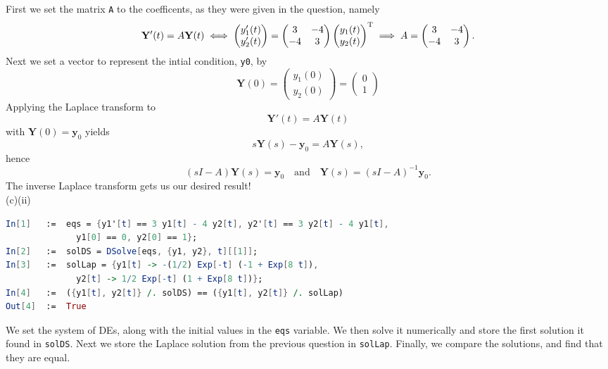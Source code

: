 \documentclass[a4paper,11pt]{report}
\begin{document}
First we set the matrix \texttt{A} to the coefficents, as they were given in the question, namely
$$
  \mathbf{Y}'(t) = A\mathbf{Y}(t) \iff \begin{pmatrix} y_1'(t) \\ y_2'(t) \end{pmatrix} = \begin{pmatrix} 3 & -4 \\ -4 & 3 \end{pmatrix} \begin{pmatrix} y_1(t) \\ y_2(t) \end{pmatrix}^{\mathrm{T}} \implies A = \begin{pmatrix} 3 & -4 \\ -4 & 3 \end{pmatrix}.
$$
Next we set a vector to represent the intial condition, \texttt{y0}, by
$$
  \textbf{Y}(0) = \begin{pmatrix} y_1 (0) \\ y_2(0) \end{pmatrix} = \begin{pmatrix} 0 \\ 1 \end{pmatrix}
$$
Applying the Laplace transform to
$$ 
  \mathbf Y'(t)=A\mathbf Y(t)
$$
with $\mathbf Y(0)=\mathbf y_0$ yields
$$
  s\mathbf Y(s)-\mathbf y_0=A\mathbf Y(s),
$$
hence
$$
  (sI-A)\mathbf{Y}(s)=\mathbf y_0\quad \text{and}\quad \mathbf{Y}(s)=(sI-A)^{-1}\mathbf y_0.
$$
The inverse Laplace transform gets us our desired result! \\

\sol (c)(ii)
\begin{lstlisting}[language=Mathematica]
In[1]   :=  eqs = {y1'[t] == 3 y1[t] - 4 y2[t], y2'[t] == 3 y2[t] - 4 y1[t], 
              y1[0] == 0, y2[0] == 1};             
In[2]   :=  solDS = DSolve[eqs, {y1, y2}, t][[1]];
In[3]   :=  solLap = {y1[t] -> -(1/2) Exp[-t] (-1 + Exp[8 t]),
              y2[t] -> 1/2 Exp[-t] (1 + Exp[8 t])};
In[4]   :=  ({y1[t], y2[t]} /. solDS) == ({y1[t], y2[t]} /. solLap)
Out[4]  :=  True
\end{lstlisting}
We set the system of DEs, along with the initial values in the \texttt{eqs} variable. We then solve it numerically and store the first solution it found in \texttt{solDS}. Next we store the Laplace solution from the previous question in \texttt{solLap}. Finally, we compare the solutions, and find that they are equal.
\end{document}
